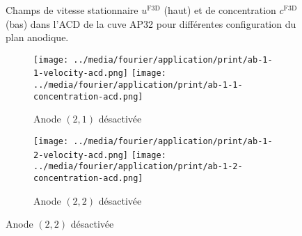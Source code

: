 \begin{figure}
\begin{center}
    \caption{Champs de vitesse stationnaire $u^{\mathrm{F3D}}$ (haut) et de
      concentration $c^\mathrm{F3D}$ (bas) dans l'ACD de la cuve
      AP32 pour différentes configuration du plan anodique.}
    \label{fig:f3d-deactivated}
  \end{center}
\end{figure}

\begin{figure}
  \begin{center}
    \begin{subfigure}[t]{\textwidth}
      \begin{center}
        \texttt{[image: ../media/fourier/application/print/ab-1-1-velocity-acd.png]}
        \texttt{[image: ../media/fourier/application/print/ab-1-1-concentration-acd.png]}
        \caption{Anode $(2,1)$ désactivée}
      \end{center}
    \end{subfigure}
    \begin{subfigure}[t]{\textwidth}
      \begin{center}
        \texttt{[image: ../media/fourier/application/print/ab-1-2-velocity-acd.png]}
        \texttt{[image: ../media/fourier/application/print/ab-1-2-concentration-acd.png]}
        \caption{Anode $(2,2)$ désactivée}
      \end{center}
    \end{subfigure}


\end{center}
\end{figure}
